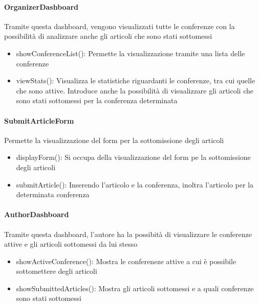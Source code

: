 \paragraph{OrganizerDashboard}
Tramite questa dashboard, vengono visualizzati tutte le conferenze con la possibilità di analizzare anche gli articoli che sono stati sottomessi\\
\begin{itemize}
\item showConferenceList(): Permette la visualizzazione tramite una lista delle conferenze\\
\item viewStats(): Visualizza le statistiche riguardanti le conferenze, tra cui quelle che sono attive. Introduce anche la possibilità di visualizzare gli articoli che sono stati sottomessi per la conferenza determinata\\
\end{itemize}

\paragraph{SubmitArticleForm}
Permette la visualizzazione del form per la sottomissione degli articoli\\
\begin{itemize}
\item displayForm(): Si occupa della visualizzazione del form pe la sottomissione degli articoli\\
\item submitArticle(): Inserendo l'articolo e la conferenza, inoltra l'articolo per la determinata conferenza\\
\end{itemize}

\paragraph{AuthorDashboard}
Tramite questa dashboard, l'autore ha la possibità di visualizzare le conferenze attive e gli articoli sottomessi da lui stesso\\
\begin{itemize}
\item showActiveConference(): Mostra le confereneze attive a cui è possibile sottomettere degli articoli\\
\item showSubmittedArticles(): Mostra gli articoli sottomessi e a quali conferenze sono stati sottomessi\\
\end{itemize}



